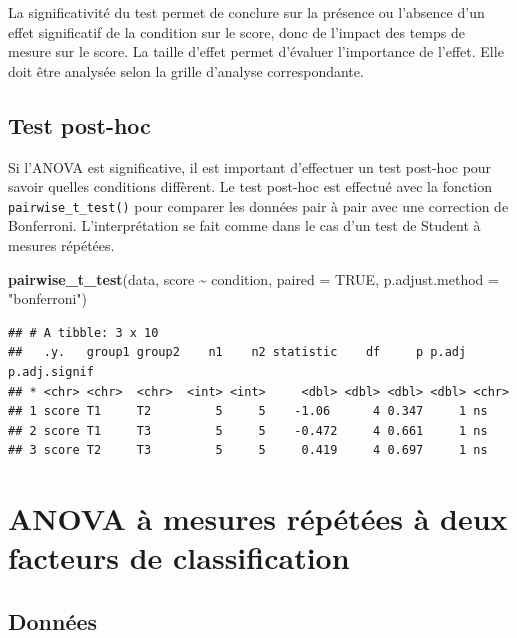 \documentclass[
]{book}
\newenvironment{Shaded}{\begin{snugshade}}{\end{snugshade}}
\newcommand{\AttributeTok}[1]{\textcolor[rgb]{0.13,0.29,0.53}{#1}}
\newcommand{\ConstantTok}[1]{\textcolor[rgb]{0.56,0.35,0.01}{#1}}
\newcommand{\FunctionTok}[1]{\textcolor[rgb]{0.13,0.29,0.53}{\textbf{#1}}}
\newcommand{\NormalTok}[1]{#1}
\newcommand{\SpecialCharTok}[1]{\textcolor[rgb]{0.81,0.36,0.00}{\textbf{#1}}}
\newcommand{\StringTok}[1]{\textcolor[rgb]{0.31,0.60,0.02}{#1}}
\begin{document}
La significativité du test permet de conclure sur la présence ou l'absence d'un effet significatif de la condition sur le score, donc de l'impact des temps de mesure sur le score. La taille d'effet permet d'évaluer l'importance de l'effet. Elle doit être analysée selon la grille d'analyse correspondante.

\subsection{Test post-hoc}\label{test-post-hoc}

Si l'ANOVA est significative, il est important d'effectuer un test post-hoc pour savoir quelles conditions diffèrent. Le test post-hoc est effectué avec la fonction \texttt{pairwise\_t\_test()} pour comparer les données pair à pair avec une correction de Bonferroni. L'interprétation se fait comme dans le cas d'un test de Student à mesures répétées.

\begin{Shaded}
\begin{Highlighting}[]
\FunctionTok{pairwise\_t\_test}\NormalTok{(data, score }\SpecialCharTok{\textasciitilde{}}\NormalTok{ condition, }\AttributeTok{paired =} \ConstantTok{TRUE}\NormalTok{, }
                \AttributeTok{p.adjust.method =} \StringTok{"bonferroni"}\NormalTok{)}
\end{Highlighting}
\end{Shaded}

\begin{verbatim}
## # A tibble: 3 x 10
##   .y.   group1 group2    n1    n2 statistic    df     p p.adj p.adj.signif
## * <chr> <chr>  <chr>  <int> <int>     <dbl> <dbl> <dbl> <dbl> <chr>       
## 1 score T1     T2         5     5    -1.06      4 0.347     1 ns          
## 2 score T1     T3         5     5    -0.472     4 0.661     1 ns          
## 3 score T2     T3         5     5     0.419     4 0.697     1 ns
\end{verbatim}

\section{ANOVA à mesures répétées à deux facteurs de classification}\label{anova-uxe0-mesures-ruxe9puxe9tuxe9es-uxe0-deux-facteurs-de-classification}

\subsection{Données}\label{donnuxe9es}
\end{document}
